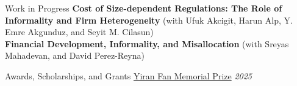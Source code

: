 \documentclass{resume} %
\begin{document}
		\begin{rSection}{Work in Progress}
			\textbf{Cost of Size-dependent Regulations: The Role of Informality and Firm Heterogeneity} (with Ufuk Akcigit, Harun Alp, Y. Emre Akgunduz, and Seyit M. Cilasun)\\

			\textbf{Financial Development, Informality, and Misallocation} (with Sreyas Mahadevan, and David Perez-Reyna)
		\end{rSection}

		\begin{rSection}{Awards, Scholarships, and Grants}
			\href{https://www.chicagobooth.edu/phd/yiran-fan-memorial-conference}{Yiran Fan Memorial Prize} \hfill {\em 2025}
		\end{rSection}
\end{document}
